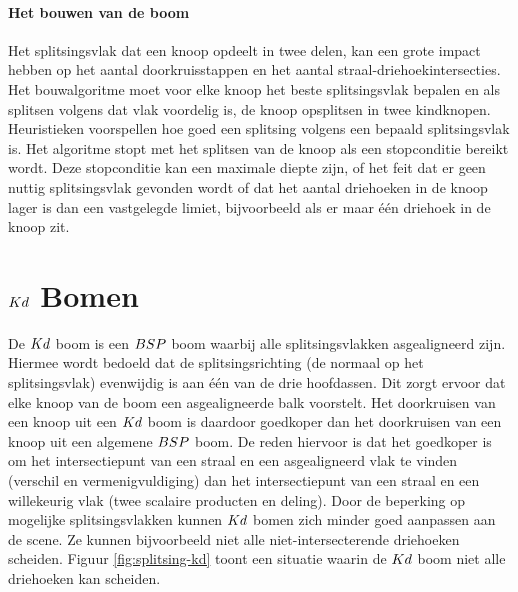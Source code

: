     \paragraph{Het bouwen van de boom}
    Het splitsingsvlak dat een knoop opdeelt in twee delen, kan een grote impact hebben op het aantal doorkruisstappen en het aantal straal-driehoekintersecties.
    Het bouwalgoritme moet voor elke knoop het beste splitsingsvlak bepalen en als splitsen volgens dat vlak voordelig is, de knoop opsplitsen in twee kindknopen.
    Heuristieken voorspellen hoe goed een splitsing volgens een bepaald splitsingsvlak is.   
    Het algoritme stopt met het splitsen van de knoop als een stopconditie bereikt wordt.
    Deze stopconditie kan een maximale diepte zijn, of het feit dat er geen nuttig splitsingsvlak gevonden wordt of dat het aantal driehoeken in de knoop lager is dan een vastgelegde limiet, bijvoorbeeld als er maar één driehoek in de knoop zit.

   
\section{$Kd$ Bomen}   
    De $Kd$ boom is een $BSP$ boom waarbij alle splitsingsvlakken asgealigneerd zijn.
    Hiermee wordt bedoeld dat de splitsingsrichting (de normaal op het splitsingsvlak) evenwijdig is aan één van de drie hoofdassen.
    Dit zorgt ervoor dat elke knoop van de boom een asgealigneerde balk voorstelt.
    Het doorkruisen van een knoop uit een $Kd$ boom is daardoor goedkoper dan het doorkruisen van een knoop uit een algemene $BSP$ boom.
    De reden hiervoor is dat het goedkoper is om het intersectiepunt van een straal en een asgealigneerd vlak te vinden (verschil en vermenigvuldiging) dan het intersectiepunt van een straal en een willekeurig vlak (twee scalaire producten en deling).
    Door de beperking op mogelijke splitsingsvlakken kunnen $Kd$ bomen zich minder goed aanpassen aan de scene.
    Ze kunnen bijvoorbeeld niet alle niet-intersecterende driehoeken scheiden. 
    Figuur \ref{fig:splitsing-kd} toont een situatie waarin de $Kd$ boom niet alle driehoeken kan scheiden.
    \\

